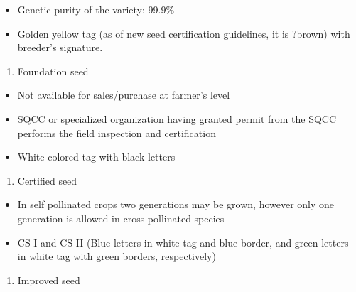 \documentclass[
]{book}
\providecommand{\tightlist}{%
  \setlength{\itemsep}{0pt}\setlength{\parskip}{0pt}}
\begin{document}
\begin{itemize}
\tightlist
\item
  Genetic purity of the variety: 99.9\%
\item
  Golden yellow tag (as of new seed certification guidelines, it is ?brown) with breeder's signature.
\end{itemize}

\begin{enumerate}
\def\labelenumi{\arabic{enumi}.}
\setcounter{enumi}{1}
\tightlist
\item
  Foundation seed
\end{enumerate}

\begin{itemize}
\tightlist
\item
  Not available for sales/purchase at farmer's level
\item
  SQCC or specialized organization having granted permit from the SQCC performs the field inspection and certification
\item
  White colored tag with black letters
\end{itemize}

\begin{enumerate}
\def\labelenumi{\arabic{enumi}.}
\setcounter{enumi}{1}
\tightlist
\item
  Certified seed
\end{enumerate}

\begin{itemize}
\tightlist
\item
  In self pollinated crops two generations may be grown, however only one generation is allowed in cross pollinated species
\item
  CS-I and CS-II (Blue letters in white tag and blue border, and green letters in white tag with green borders, respectively)
\end{itemize}

\begin{enumerate}
\def\labelenumi{\arabic{enumi}.}
\setcounter{enumi}{2}
\tightlist
\item
  Improved seed
\end{enumerate}
\end{document}

